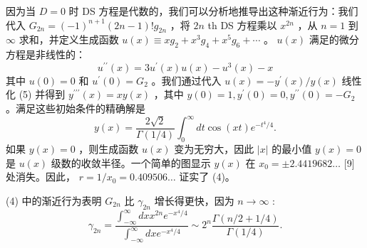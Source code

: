 \documentclass[UTF8]{article}
\begin{document}
因为当 \( D=0 \) 时 DS 方程是代数的，我们可以分析地推导出这种渐近行为：我们代入 \( G_{2 n}=(-1)^{n+1}(2 n-1) ! g_{2 n} \) ，将 \( 2 n \) th DS 方程乘以 \( x^{2 n} \) ，从 \( n=1 \) 到 \( \infty \) 求和，并定义生成函数 \( u(x) \equiv x g_{2}+x^{3} g_{4}+x^{5} g_{6}+\cdots \) 。 \( u(x) \) 满足的微分方程是非线性的： \[u^{\prime \prime}(x)=3 u^{\prime}(x) u(x)-u^{3}(x)-x
\] 其中 \( u(0)=0 \) 和 \( u^{\prime}(0)=G_{2} \) 。我们通过代入 \( u(x)=-y^{\prime}(x) / y(x) \) 线性化 (5) 并得到 \( y^{\prime \prime \prime}(x)=x y(x) \) ，其中 \( y(0)=1, y^{\prime}(0)=0, y^{\prime \prime}(0)=-G_{2} \) 。满足这些初始条件的精确解是 \[y(x)=\frac{2 \sqrt{2}}{\Gamma(1 / 4)} \int_{0}^{\infty} d t \cos (x t) e^{-t^{4} / 4} .
\] 如果 \( y(x)=0 \) ，则生成函数 \( u(x) \) 变为无穷大，因此 \( |x| \) 的最小值 \( y(x)=0 \) 是 \( u(x) \) 级数的收敛半径。一个简单的图显示 \( y(x) \) 在 \( x_{0}= \pm 2.4419682 \ldots \) [9] 处消失。因此， \( r=1 / x_{0}=0.409506 \ldots \) 证实了 (4)。

(4) 中的渐近行为表明 \( G_{2 n} \) 比 \( \gamma_{2 n} \) 增长得更快，因为 \( n \rightarrow \infty \) : \[
\gamma_{2 n}=\frac{\int_{-\infty}^{\infty} d x x^{2 n} e^{-x^{4} / 4}}{\int_{-\infty}^{\infty} d x e^{-x^{4} / 4}} \sim 2^{n} \frac{\Gamma(n / 2+1 / 4)}{\Gamma(1 / 4)} .
\]
\end{document}

